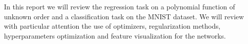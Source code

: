 In this report we will review the regression task on a polynomial function of unknown order and a classification task on 
the MNIST dataset. We will review with particular attention the use of optimizers, regularization methods, hyperparameters
optimization and feature visualization for the networks.